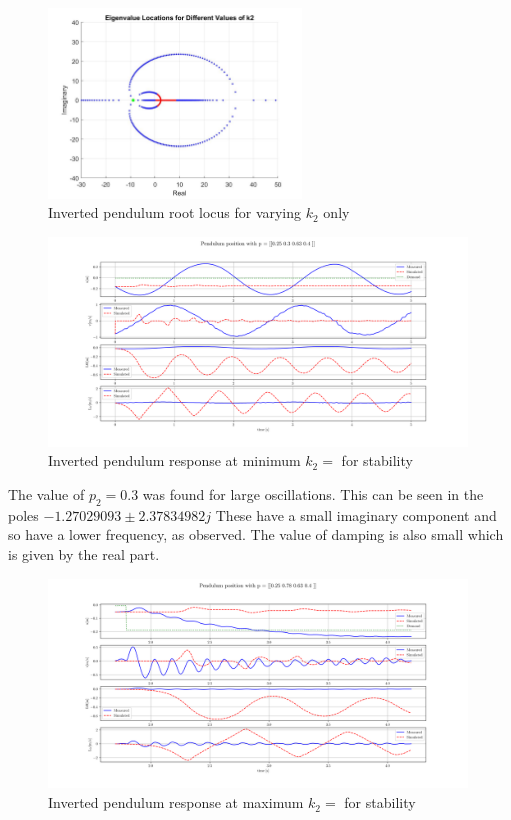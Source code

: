 \documentclass{article}
\begin{document}

\begin{figure}[H]
  \centering
  \includegraphics[width=0.6\textwidth]{figures/4.4roots.jpg}
  \caption{Inverted pendulum root locus for varying $k_2$ only}
  \label{fig:roots4.4}
\end{figure}

\begin{figure}[H]
  \centering
  \includegraphics[width=0.99\textwidth]{figures/4.4_lo.png}
  \caption{Inverted pendulum response at minimum $k_2 = $ for stability}
  \label{fig:roots4.4_lo}
\end{figure}

The value of $p_2 = 0.3$ was found for large oscillations.
This can be seen in the poles $-1.27029093 \pm 2.37834982j$
These have a small imaginary component and so have a lower frequency, as observed.
The value of damping is also small which is given by the real part.

\begin{figure}[H]
  \centering
  \includegraphics[width=0.99\textwidth]{figures/4.4_hi.png}
  \caption{Inverted pendulum response at maximum $k_2 = $ for stability}
  \label{fig:roots4.4_hi}
\end{figure}
\end{document}
